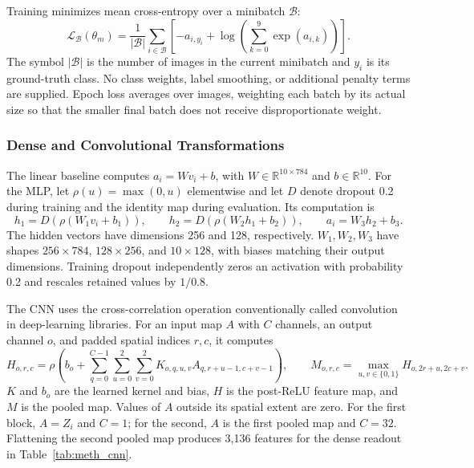 Training minimizes mean cross-entropy over a minibatch $\mathcal{B}$:
\begin{equation}
 \mathcal{L}_{\mathcal{B}}(\theta_m)=
 \frac{1}{|\mathcal{B}|}\sum_{i\in\mathcal{B}}
 \left[-a_{i,y_i}+\log\!\left(\sum_{k=0}^{9}\exp(a_{i,k})\right)\right].
 \label{eq:meth_loss}
\end{equation}
The symbol $|\mathcal{B}|$ is the number of images in the current minibatch
and $y_i$ is its ground-truth class. No class weights, label smoothing, or
additional penalty terms are supplied. Epoch loss averages over images,
weighting each batch by its actual size so that the smaller final batch does
not receive disproportionate weight.

\subsubsection{Dense and Convolutional Transformations}
The linear baseline computes $a_i=Wv_i+b$, with
$W\in\mathbb{R}^{10\times784}$ and $b\in\mathbb{R}^{10}$. For the MLP,
let $\rho(u)=\max(0,u)$ elementwise and let $D$ denote dropout 0.2 during
training and the identity map during evaluation. Its computation is
\begin{equation}
 h_1=D(\rho(W_1v_i+b_1)),\qquad
 h_2=D(\rho(W_2h_1+b_2)),\qquad a_i=W_3h_2+b_3.
 \label{eq:meth_mlp}
\end{equation}
The hidden vectors have dimensions 256 and 128, respectively.
$W_1,W_2,W_3$ have shapes $256\times784$, $128\times256$, and
$10\times128$, with biases matching their output dimensions.
Training dropout independently zeros an activation with probability 0.2 and
rescales retained values by $1/0.8$.

The CNN uses the cross-correlation operation conventionally called
convolution in deep-learning libraries. For an input map $A$ with $C$
channels, an output channel $o$, and padded spatial indices $r,c$, it computes
\begin{equation}
 H_{o,r,c}=\rho\!\left(b_o+
 \sum_{q=0}^{C-1}\sum_{u=0}^{2}\sum_{v=0}^{2}
 K_{o,q,u,v}A_{q,r+u-1,c+v-1}\right),\qquad
 M_{o,r,c}=\max_{u,v\in\{0,1\}} H_{o,2r+u,2c+v}.
 \label{eq:meth_conv}
\end{equation}
$K$ and $b_o$ are the learned kernel and bias, $H$ is the post-ReLU feature
map, and $M$ is the pooled map. Values of $A$ outside its spatial extent are
zero. For the first block, $A=Z_i$ and $C=1$; for the second, $A$ is the
first pooled map and $C=32$. Flattening the second pooled map produces 3,136
features for the dense readout in Table~\ref{tab:meth_cnn}.

